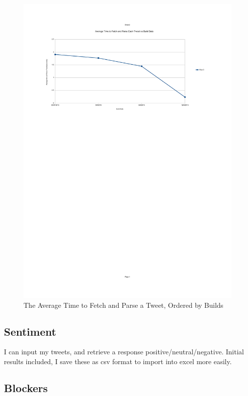 \begin{figure}[h!]
\centering
\includegraphics{Images/average_time_to_fetch_parse_tweets_per_build.pdf}
\caption{The Average Time to Fetch and Parse a Tweet, Ordered by Builds}
\end{figure}


\subsection{Sentiment}

I can input my tweets, and retrieve a response positive/neutral/negative. Initial results included, I save these as csv format to import into excel more easily.\\

\subsection{Blockers}

